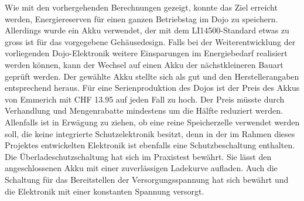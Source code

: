 Wie mit den vorhergehenden Berechnungen gezeigt, konnte das Ziel erreicht werden, Energiereserven für einen ganzen Betriebstag im Dojo zu speichern. Allerdings wurde ein Akku verwendet, der mit dem LI14500-Standard etwas zu gross ist für das vorgegebene Gehäusedesign. Falls bei der Weiterentwicklung der vorliegenden Dojo-Elektronik weitere Einsparungen im Energiebedarf realisiert werden können, kann der Wechsel auf einen Akku der nächstkleineren Bauart geprüft werden. Der gewählte Akku stellte sich als gut und den Herstellerangaben entsprechend heraus. Für eine Serienproduktion des Dojos ist der Preis des Akkus von Emmerich mit CHF 13.95 auf jeden Fall zu hoch. Der Preis müsste durch Verhandlung und Mengenrabatte mindestens um die Hälfte reduziert werden. Allenfalls ist in Erwägung zu ziehen, ob eine reine Speicherzelle verwendet werden soll, die keine integrierte Schutzelektronik besitzt, denn in der im Rahmen dieses Projektes entwickelten Elektronik ist ebenfalls eine Schutzbeschaltung enthalten. Die Überladeschutzschaltung hat sich im Praxistest bewährt. Sie lässt den angeschlossenen Akku mit einer zuverlässigen Ladekurve aufladen. Auch die Schaltung für das Bereitstellen der Versorgungsspannung hat sich bewährt und die Elektronik mit einer konstanten Spannung versorgt. 

